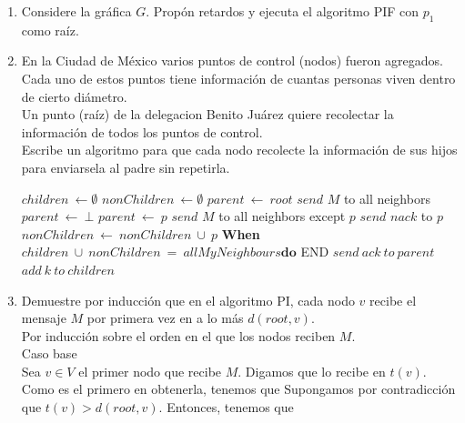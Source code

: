 \documentclass[12pt,a4paper]{report}
\begin{document}
	\begin{enumerate}
		\item {
			Considere la gráfica $G$. Propón retardos y ejecuta el algoritmo PIF con
			$p_1$ como raíz.\\
		}

		\item {
			En la Ciudad de México varios puntos de control (nodos) fueron agregados.\\
			Cada uno de estos puntos tiene información de cuantas personas viven
			dentro de cierto diámetro. \\
			Un punto (raíz) de la delegacion Benito Juárez quiere recolectar la
			información de todos los puntos de control. \\
			Escribe un algoritmo para que cada nodo recolecte la información de sus
			hijos para enviarsela al padre sin repetirla.\\

			\begin{algorithmic}[1]
					\State $children \ \leftarrow \emptyset$
					\State $nonChildren \ \leftarrow \emptyset$
						\State $parent\ \leftarrow\ root$
						\State $send$ $M$ to all neighbors
					\Else
						\State $parent\ \leftarrow\ \bot$
					\EndIf
					\State {}
					\Start
							\State $parent\ \leftarrow\ p$
							\State $send$ $M$ to all neighbors except $p$
						\Else
							\State $send$ $nack$ to $p$
						\EndIf
					\End
					\State {}
					\Start
						\State $nonChildren\ \leftarrow\ nonChildren\ \cup\ {p}$
					\End
					\textbf{When} $children\ \cup\ nonChildren\ =\ allMyNeighbours
								\textbf{do}$
					\Start
							\State END
						\Else
							\State $send\ ack\ to\ parent$
						\EndIf
					\Start
						\State $add\ k\ to\ children$
					\End
					\End
			\end{algorithmic}
			}

		\item{
			Demuestre por inducción que en el algoritmo PI, cada nodo $v$ recibe el
			mensaje $M$ por primera vez en a lo más $d(root, v)$.\\

			Por inducción sobre el orden en el que los nodos reciben $M$.\\
			Caso base\\
			Sea $v \in V$ el primer nodo que recibe $M$. Digamos que lo recibe en $t(v)$.\\
			Como es el primero en obtenerla, tenemos que
			Supongamos por contradicción que $t(v) > d(root, v)$. Entonces, tenemos que


}
\end{enumerate}
\end{document}
